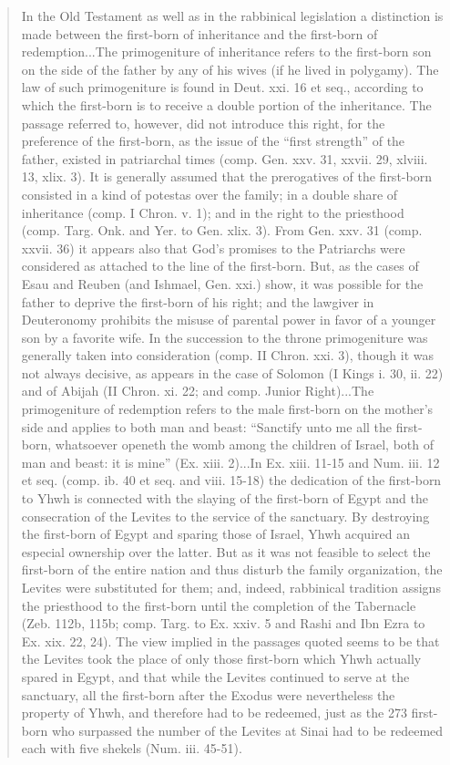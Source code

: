 {\begin{quote}
							In the Old Testament as well as in the rabbinical legislation a distinction is made between the first-born of inheritance and the first-born of redemption...The primogeniture of inheritance refers to the first-born son on the side of the father by any of his wives (if he lived in polygamy). The law of such primogeniture is found in Deut. xxi. 16 et seq., according to which the first-born is to receive a double portion of the inheritance. The passage referred to, however, did not introduce this right, for the preference of the first-born, as the issue of the ``first strength'' of the father, existed in patriarchal times (comp. Gen. xxv. 31, xxvii. 29, xlviii. 13, xlix. 3). It is generally assumed that the prerogatives of the first-born consisted in a kind of potestas over the family; in a double share of inheritance (comp. I Chron. v. 1); and in the right to the priesthood (comp. Targ. Onk. and Yer. to Gen. xlix. 3). From Gen. xxv. 31 (comp. xxvii. 36) it appears also that God's promises to the Patriarchs were considered as attached to the line of the first-born. But, as the cases of Esau and Reuben (and Ishmael, Gen. xxi.) show, it was possible for the father to deprive the first-born of his right; and the lawgiver in Deuteronomy prohibits the misuse of parental power in favor of a younger son by a favorite wife. In the succession to the throne primogeniture was generally taken into consideration (comp. II Chron. xxi. 3), though it was not always decisive, as appears in the case of Solomon (I Kings i. 30, ii. 22) and of Abijah (II Chron. xi. 22; and comp. Junior Right)...The primogeniture of redemption refers to the male first-born on the mother's side and applies to both man and beast: ``Sanctify unto me all the first-born, whatsoever openeth the womb among the children of Israel, both of man and beast: it is mine'' (Ex. xiii. 2)...In Ex. xiii. 11-15 and Num. iii. 12 et seq. (comp. ib. 40 et seq. and viii. 15-18) the dedication of the first-born to Yhwh is connected with the slaying of the first-born of Egypt and the consecration of the Levites to the service of the sanctuary. By destroying the first-born of Egypt and sparing those of Israel, Yhwh acquired an especial ownership over the latter. But as it was not feasible to select the first-born of the entire nation and thus disturb the family organization, the Levites were substituted for them; and, indeed, rabbinical tradition assigns the priesthood to the first-born until the completion of the Tabernacle (Zeb. 112b, 115b; comp. Targ. to Ex. xxiv. 5 and Rashi and Ibn Ezra to Ex. xix. 22, 24). The view implied in the passages quoted seems to be that the Levites took the place of only those first-born which Yhwh actually spared in Egypt, and that while the Levites continued to serve at the sanctuary, all the first-born after the Exodus were nevertheless the property of Yhwh, and therefore had to be redeemed, just as the 273 first-born who surpassed the number of the Levites at Sinai had to be redeemed each with five shekels (Num. iii. 45-51).
						\end{quote}
					}

